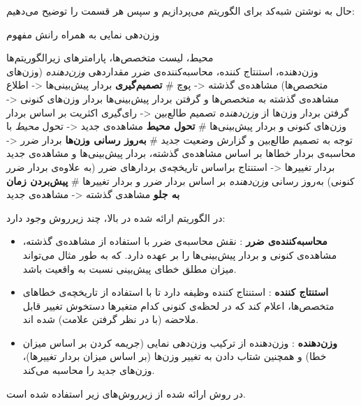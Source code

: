 \documentclass[a4paper,11px]{article}
\begin{document}
حال به نوشتن شبه‌کد برای الگوریتم می‌پردازیم و سپس هر قسمت را توضیح می‌دهیم:
\begin{algorithm}[H]
\caption{
وزن‌دهی نمایی به همراه رانش مفهوم
}
\begin{algorithmic}[1]
\REQUIRE
محیط، لیست متخصص‌ها، پارامترهای زیرالگوریتم‌ها\\
وزن‌دهنده، استنتاج کننده، محاسبه‌کننده‌ی ضرر
  \STATE
  مقداردهی 
  \textit{
  وزن‌دهنده
  }
  (وزن‌های متخصص‌ها)
  \STATE 
  مشاهده‌ی گذشته <- پوچ
  \STATE 
  \# \textbf{
  تصمیم‌گیری
  }
  \STATE 
  بردار پیش‌بینی‌ها <- اطلاع مشاهده‌ی گذشته به متخصص‌ها و گرفتن بردار پیش‌بینی‌ها
  \STATE 
  بردار وزن‌های کنونی <- گرفتن بردار وزن‌ها از 
  \textit{
  وزن‌دهنده
  }
  \STATE
  تصمیم طالع‌بین <- رای‌گیری اکثریت بر اساس بردار وزن‌های کنونی و بردار پیش‌بینی‌ها
  \STATE 
  \# \textbf{
  تحول محیط
  }
  \STATE 
  مشاهده‌ی جدید <- تحول 
  \textit{
  محیط
  } 
  با توجه به تصمیم طالع‌بین و گزارش وضعیت جدید
  \STATE 
  \# \textbf{
  به‌روز رسانی وزن‌ها
  }
  \STATE 
  بردار ضرر <- محاسبه‌ی بردار خطاها بر اساس مشاهده‌ی گذشته، بردار پیش‌بینی‌ها و مشاهده‌ی جدید
  \STATE 
  بردار تغییرها <- استنتاج براساس تاریخچه‌ی بردارهای ضرر (به علاوه‌ی بردار ضرر کنونی)
  \STATE 
  به‌روز رسانی 
  \textit{
  وزن‌دهنده
  } 
  بر اساس بردار ضرر و بردار تغییرها
  \STATE 
  \# \textbf{
  پیش‌بردن زمان به جلو
  }
  \STATE 
  مشاهد‌ی گذشته <- مشاهده‌ی جدید
  \ENDWHILE
\end{algorithmic}
\end{algorithm}

در الگوریتم ارائه شده در بالا، چند زیرروش وجود دارد:
\begin{itemize}
\item \textbf{
محاسبه‌کننده‌ی ضرر
}: نقش محاسبه‌ی ضرر
با استفاده از مشاهده‌ی گذشته، مشاهده‌ی کنونی و بردار پیش‌بینی‌ها را بر عهده دارد. که به طور مثال می‌تواند میزان مطلق خطای پیش‌بینی نسبت به واقعیت باشد.

\item \textbf{
استنتاج کننده
}: استنتاج کننده وظیفه دارد تا با استفاده از تاریخچه‌ی خطاهای متخصص‌ها، اعلام کند که در لحظه‌ی کنونی کدام متغیرها دستخوش تغییر قابل ملاحضه (با در نظر گرفتن علامت) شده اند.

\item \textbf{
وزن‌دهنده
}: وزن‌دهنده از ترکیب وزن‌دهی نمایی (جریمه کردن بر اساس میزان خطا) و همچنین شتاب دادن به تغییر وزن‌ها (بر اساس میزان بردار تغییرها)، وزن‌های جدید را محاسبه می‌کند.
\end{itemize}

در روش ارائه شده از زیرروش‌های زیر استفاده شده است.
\end{document}
